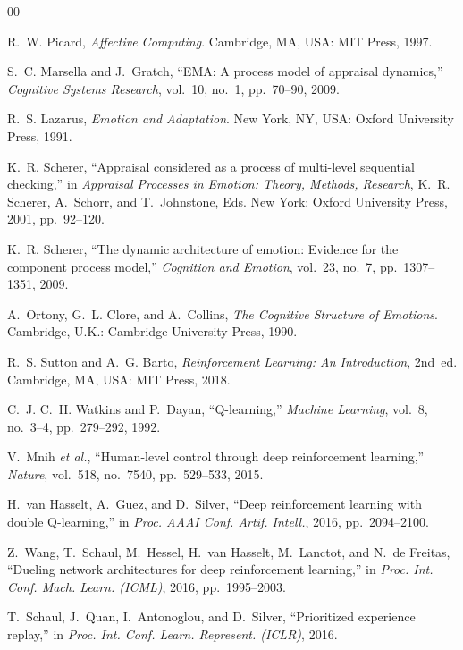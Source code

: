 \documentclass[conference]{IEEEtran}
\begin{document}
\balance

\begin{thebibliography}{00}

R.~W. Picard, \emph{Affective Computing}. Cambridge, MA, USA: MIT Press, 1997.

S.~C. Marsella and J.~Gratch, ``EMA: A process model of appraisal dynamics,''
\emph{Cognitive Systems Research}, vol.~10, no.~1, pp.~70--90, 2009.

R.~S. Lazarus, \emph{Emotion and Adaptation}. New York, NY, USA: Oxford
University Press, 1991.

K.~R. Scherer, ``Appraisal considered as a process of multi-level sequential
checking,'' in \emph{Appraisal Processes in Emotion: Theory, Methods,
Research}, K.~R. Scherer, A.~Schorr, and T.~Johnstone, Eds. New York: Oxford
University Press, 2001, pp.~92--120.

K.~R. Scherer, ``The dynamic architecture of emotion: Evidence for the
component process model,'' \emph{Cognition and Emotion}, vol.~23, no.~7,
pp.~1307--1351, 2009.

A.~Ortony, G.~L. Clore, and A.~Collins, \emph{The Cognitive Structure of
Emotions}. Cambridge, U.K.: Cambridge University Press, 1990.

R.~S. Sutton and A.~G. Barto, \emph{Reinforcement Learning: An Introduction},
2nd~ed. Cambridge, MA, USA: MIT Press, 2018.

C.~J. C.~H. Watkins and P.~Dayan, ``Q-learning,'' \emph{Machine Learning},
vol.~8, no.~3--4, pp.~279--292, 1992.

V.~Mnih \emph{et al.}, ``Human-level control through deep reinforcement
learning,'' \emph{Nature}, vol.~518, no.~7540, pp.~529--533, 2015.

H.~van Hasselt, A.~Guez, and D.~Silver, ``Deep reinforcement learning with
double Q-learning,'' in \emph{Proc. AAAI Conf. Artif. Intell.}, 2016,
pp.~2094--2100.

Z.~Wang, T.~Schaul, M.~Hessel, H.~van Hasselt, M.~Lanctot, and N.~de Freitas,
``Dueling network architectures for deep reinforcement learning,'' in
\emph{Proc. Int. Conf. Mach. Learn. (ICML)}, 2016, pp.~1995--2003.

T.~Schaul, J.~Quan, I.~Antonoglou, and D.~Silver, ``Prioritized experience
replay,'' in \emph{Proc. Int. Conf. Learn. Represent. (ICLR)}, 2016.


\end{thebibliography}
\end{document}
